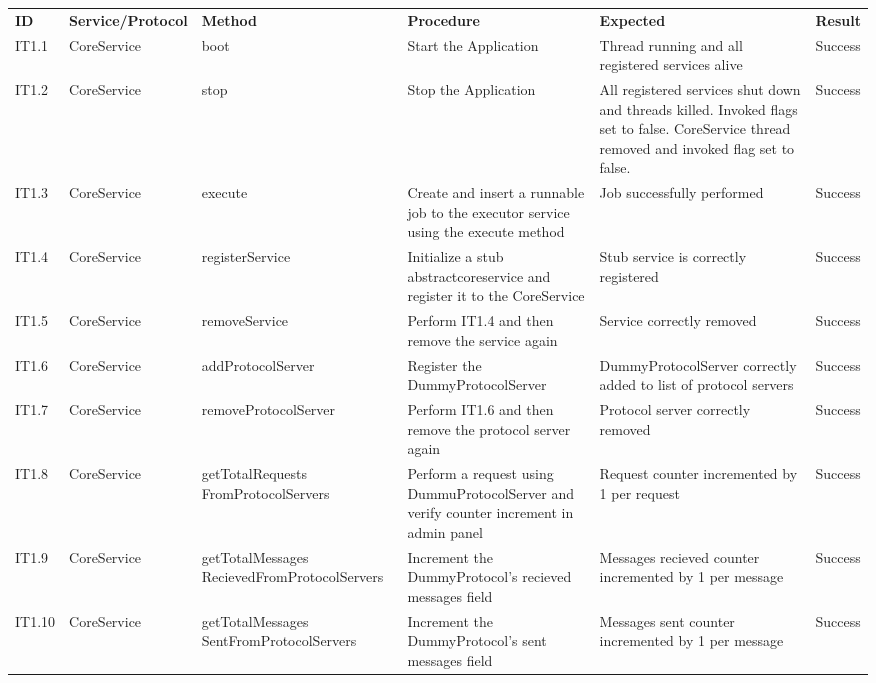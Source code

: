 \begin{table}[ht!]
\tiny
\begin{tabular}{|m{0.5cm}|m{1.5cm}|m{1.5cm}|m{3cm}|m{3cm}|m{1.5cm}|}
\hline
\rowcolor{lightgray}
\multicolumn{6}{|c|}{\textbf{Core Service}} \\ \hline
\rowcolor{lightgray}
\textbf{ID} & \textbf{Service/Protocol} & \textbf{Method} & \textbf{Procedure} & \textbf{Expected} & \textbf{Result}\\ \hline
IT1.1 & CoreService & boot & Start the Application & Thread running and all registered services alive & Success \\ \hline
IT1.2 & CoreService & stop & Stop the Application & All registered services shut down and threads killed. Invoked flags set to false. CoreService thread removed and invoked flag set to false. & Success \\ \hline
IT1.3 &CoreService & execute & Create and insert a runnable job to the executor service using the execute method & Job successfully performed & Success \\ \hline
IT1.4 & CoreService & registerService & Initialize a stub abstractcoreservice and register it to the CoreService & Stub service is correctly registered & Success \\ \hline
IT1.5 & CoreService & removeService & Perform IT1.4 and then remove the service again & Service correctly removed & Success \\ \hline
IT1.6 & CoreService & addProtocolServer & Register the DummyProtocolServer & DummyProtocolServer correctly added to list of protocol servers & Success \\ \hline
IT1.7 & CoreService & removeProtocolServer & Perform IT1.6 and then remove the protocol server again & Protocol server correctly removed & Success \\ \hline
IT1.8 & CoreService & getTotalRequests FromProtocolServers & Perform a request using DummuProtocolServer and verify counter increment in admin panel & Request counter incremented by 1 per request & Success \\ \hline
IT1.9 & CoreService & getTotalMessages RecievedFromProtocolServers & Increment the DummyProtocol's recieved messages field & Messages recieved counter incremented by 1 per message & Success \\ \hline
IT1.10 & CoreService & getTotalMessages SentFromProtocolServers & Increment the DummyProtocol's sent messages field & Messages sent counter incremented by 1 per message & Success \\ \hline

\end{tabular}
\end{table}

